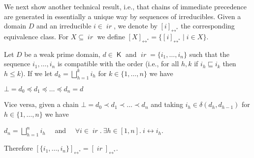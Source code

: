 \documentclass[conference]{IEEEtran}
\newcommand{\compact}[1]{\ensuremath{\mathop{\mathsf{K}({#1})}}}
\newcommand{\ir}[1]{\ensuremath{\mathop{\mathit{ir}({#1})}}}
\newcommand{\diff}[2]{\ensuremath{\delta({#1},{#2})}}
\newcommand{\eqclass}[2][]{\ensuremath{[{#2}]_{\scriptscriptstyle {#1}}}}
\newcommand{\eqclassir}[1]{\ensuremath{\eqclass[\leftrightarrow^*]{#1}}}
\newcommand{\interval}[2][1]{\ensuremath{[{#1},{#2}]}}
\begin{document}
We next show another technical result, i.e., that chains of immediate
precedence are generated in essentially a unique way by sequences of
irreducibles. Given a domain $D$ and an irreducible $i \in \ir{D}$, we
denote by $\eqclassir{i}$ the corresponding equivalence class. For
$X \subseteq \ir{D}$ we define
$\eqclassir{X} = \{ \eqclassir{i} \mid i \in X \}$.

\begin{lemma}
  \label{le:chains}
  Let $D$ be a weak prime domain, $d \in \compact{D}$ and
  $\ir{d} = \{ i_1, \ldots, i_n \}$ such that the sequence
  $i_1, \ldots, i_n$ is compatible with the order (i.e., for all
  $h, k$ if $i_h \sqsubseteq i_k$ then $h \leq k$). If we let
  $d_k = \bigsqcup_{h = 1}^k i_h$ for $k \in \{ 1, \ldots, n\}$ we
  have
  \begin{center}
    $\bot = d_0 \preceq  d_1 \preceq \ldots \preceq d_n =d$
  \end{center}
  
  Vice versa, given a chain
  $\bot = d_0\prec d_1\prec \ldots\prec d_n$ and taking
  $i_h \in \diff{d_h}{d_{h-1}}$ for
  $h \in \{ 1, \ldots, n\}$ we have
  \begin{center}
    $d_n = \bigsqcup_{h=1}^n i_h$ \ \ and \ \
    $\forall i \in \ir{d_n}.\ \exists h \in \interval{n}.\ i
    \leftrightarrow i_h$.
  \end{center}
  Therefore
  $\eqclassir{\{i_1, \ldots, i_n \}} = \eqclassir{\ir{d_n}}$.
\end{lemma}
\end{document}
